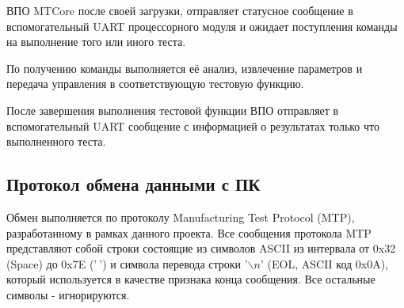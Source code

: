 \documentclass[a4paper,14pt,bachelor]{disser}
\begin{document}
ВПО MTCore после своей загрузки, отправляет статусное сообщение в вспомогательный UART процессорного модуля и ожидает поступления команды на выполнение того или иного теста.

По получению команды выполняется её анализ, извлечение параметров и передача управления в соответствующую тестовую функцию.

После завершения выполнения тестовой функции ВПО отправляет в вспомогательный UART сообщение с информацией о результатах только что выполненного теста.

\subsection{Протокол обмена данными с ПК}
Обмен выполняется по протоколу Manufacturing Test Protocol (MTP), разработанному в рамках данного проекта. Все сообщения протокола MTP представляют собой строки состоящие из символов ASCII из интервала от 0x32 (Space) до 0x7E ('$~$') и символа перевода строки '$\backslash{n}$' (EOL, ASCII код 0x0A), который используется в качестве признака конца сообщения. Все остальные символы - игнорируются.
\end{document}
